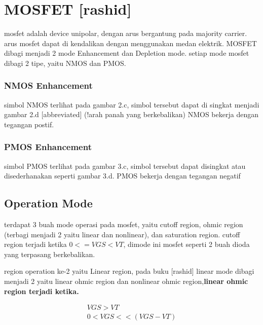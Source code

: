 



\section{MOSFET [rashid]}

mosfet adalah device unipolar, dengan arus bergantung pada majority carrier. arus mosfet dapat di kendalikan
dengan menggunakan medan elektrik. MOSFET dibagi menjadi 2 mode Enhancement dan Depletion mode. setiap mode mosfet dibagi 
2 tipe, yaitu NMOS dan PMOS.


\subsubsection{NMOS Enhancement}
simbol NMOS terlihat pada gambar 2.c, simbol tersebut dapat di singkat menjadi gambar 2.d [abbreviated] (!arah panah yang berkebalikan)
NMOS bekerja dengan tegangan postif.

\subsubsection{PMOS Enhancement}
simbol PMOS terlihat pada gambar 3.c, simbol tersebut dapat disingkat atau disederhanakan seperti gambar 3.d. 
PMOS bekerja dengan tegangan negatif

\subsection{Operation Mode}
terdapat 3 buah mode operasi pada mosfet, yaitu cutoff region, ohmic region (terbagi menjadi 2 yaitu linear dan nonlinear),
dan saturation region. cutoff region terjadi ketika $0 <= VGS < VT$, dimode ini mosfet seperti 2 buah dioda yang terpasang 
berkebalikan. 

region operation ke-2 yaitu Linear region, pada buku [rashid] linear mode dibagi menjadi 2 yaitu 
linear ohmic region dan nonlinear ohmic region,\textbf{linear ohmic region terjadi ketika. } 

\begin{gather}
  VGS > VT  \\
  0 < VGS << (VGS-VT)  
\end{gather}

